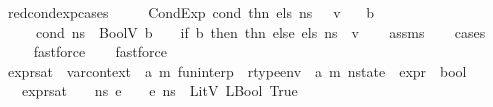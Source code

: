 \begin{isabellebody}
\isanewline
{}\isamarkupfalse%
\ red{\isacharunderscore}{\kern0pt}cond{\isacharunderscore}{\kern0pt}exp{\isacharunderscore}{\kern0pt}cases{\isacharcolon}{\kern0pt}\isanewline
\ \ \ {\isachardoublequoteopen}{\isasymLambda}{\isacharcomma}{\kern0pt}{\isasymGamma}{\isacharcomma}{\kern0pt}{\isasymOmega}\ {\isasymturnstile}\ {\isasymlangle}CondExp\ cond\ thn\ els{\isacharcomma}{\kern0pt}\ n{\isacharunderscore}{\kern0pt}s\ {\isasymrangle}\ {\isasymDown}\ v{\isachardoublequoteclose}\isanewline
\ \ \ b\isanewline
\ \ \ {\isachardoublequoteopen}{\isacharparenleft}{\kern0pt}{\isasymLambda}{\isacharcomma}{\kern0pt}{\isasymGamma}{\isacharcomma}{\kern0pt}{\isasymOmega}\ {\isasymturnstile}\ {\isasymlangle}cond{\isacharcomma}{\kern0pt}\ n{\isacharunderscore}{\kern0pt}s{\isasymrangle}\ {\isasymDown}\ BoolV\ b{\isacharparenright}{\kern0pt}\ {\isasymand}\ {\isacharparenleft}{\kern0pt}{\isasymLambda}{\isacharcomma}{\kern0pt}{\isasymGamma}{\isacharcomma}{\kern0pt}{\isasymOmega}\ {\isasymturnstile}\ {\isasymlangle}if\ b\ then\ thn\ else\ els{\isacharcomma}{\kern0pt}\ n{\isacharunderscore}{\kern0pt}s{\isasymrangle}\ {\isasymDown}\ v{\isacharparenright}{\kern0pt}{\isachardoublequoteclose}\isanewline
%
\isadelimproof
\ \ %
\endisadelimproof
%
\isatagproof
{}\isamarkupfalse%
\ assms\isanewline
\ \ \isamarkupfalse%
\ cases\isanewline
\ \ \ \isamarkupfalse%
\ fastforce\isanewline
\ \ \isamarkupfalse%
\ fastforce\isanewline
\ \ \isamarkupfalse%
%
\endisatagproof
{\isafoldproof}%
%
\isadelimproof
\isanewline
%
\endisadelimproof
\isanewline
{}\isamarkupfalse%
\ expr{\isacharunderscore}{\kern0pt}sat\ {\isacharcolon}{\kern0pt}{\isacharcolon}{\kern0pt}\ {\isachardoublequoteopen}var{\isacharunderscore}{\kern0pt}context\ {\isasymRightarrow}\ {\isacharparenleft}{\kern0pt}{\isacharprime}{\kern0pt}a{\isacharcomma}{\kern0pt}\ {\isacharprime}{\kern0pt}m{\isacharparenright}{\kern0pt}\ fun{\isacharunderscore}{\kern0pt}interp\ {\isasymRightarrow}\ rtype{\isacharunderscore}{\kern0pt}env\ {\isacharequal}{\kern0pt}{\isachargreater}{\kern0pt}\ {\isacharparenleft}{\kern0pt}{\isacharprime}{\kern0pt}a{\isacharcomma}{\kern0pt}\ {\isacharprime}{\kern0pt}m{\isacharparenright}{\kern0pt}\ nstate\ {\isasymRightarrow}\ expr\ {\isasymRightarrow}\ bool{\isachardoublequoteclose}\isanewline
\ \ \ {\isachardoublequoteopen}expr{\isacharunderscore}{\kern0pt}sat\ {\isasymLambda}\ {\isasymGamma}\ {\isasymOmega}\ n{\isacharunderscore}{\kern0pt}s\ e\ {\isacharequal}{\kern0pt}\ {\isacharparenleft}{\kern0pt}{\isasymLambda}{\isacharcomma}{\kern0pt}{\isasymGamma}{\isacharcomma}{\kern0pt}{\isasymOmega}\ {\isasymturnstile}\ {\isasymlangle}e{\isacharcomma}{\kern0pt}\ n{\isacharunderscore}{\kern0pt}s{\isasymrangle}\ {\isasymDown}\ LitV\ {\isacharparenleft}{\kern0pt}LBool\ True{\isacharparenright}{\kern0pt}{\isacharparenright}{\kern0pt}{\isachardoublequoteclose}\isanewline

\end{isabellebody}

